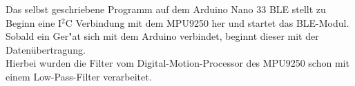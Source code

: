 Das selbst geschriebene Programm auf dem Arduino Nano 33 BLE stellt zu Beginn eine 
I$^2$C Verbindung mit dem MPU9250 her und startet das BLE-Modul.\\
Sobald ein Ger"at sich mit dem Arduino verbindet, beginnt dieser
mit der Datenübertragung.\\
Hierbei wurden die Filter vom Digital-Motion-Processor des MPU9250 
schon mit einem Low-Pass-Filter verarbeitet. 